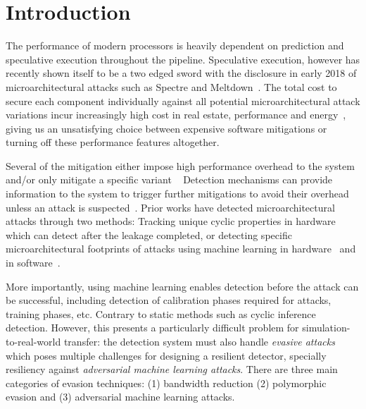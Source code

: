 \section{Introduction} \label{intro}

The performance of modern processors is heavily dependent on prediction and speculative execution throughout the pipeline.  Speculative execution, however has recently shown itself to be a two edged sword with the disclosure in early 2018 of microarchitectural attacks such as Spectre and Meltdown~\cite{spectre, meltdown}. The total cost to secure each component individually against all potential microarchitectural attack variations incur increasingly high cost in real estate, performance and energy~\cite{canella2018systematic, schwarz2019zombieload}, giving us an unsatisfying choice between expensive software mitigations or turning off these performance features altogether.  

 
Several of the mitigation either impose high performance overhead
to the system and/or only mitigate a specific variant
~\cite{taram_csf19, intelanalysis, kiriansky2018dawg, domnitser2012non,saileshwar2019cleanupspec,retpoline, wang2007new, yu2019speculative, yan2018invisispec,CEASER,amd, koruyeh2019speccfi, arm_css}
Detection mechanisms can provide information to the system to trigger further
mitigations to avoid their overhead unless an attack is suspected~\cite{gulmezoglu2019fortuneteller, PerSpectron, cyclone2019}.
Prior works have detected microarchitectural attacks through two methods: Tracking unique cyclic properties in hardware ~\cite{cyclone2019} which can detect after the leakage completed, or detecting specific microarchitectural footprints of attacks using machine learning in hardware~\cite{PerSpectron, RHMD2017} and in software~\cite{gulmezoglu2019fortuneteller, cacheBasedDetection2016Chiappetta,
CloudRadar2016,
BlackHatFogh,
payer2016hexpads,
ICCAD2015Wang,
Duppel2013Zhang, 
mushtaq:cel-01824512}. 

More importantly, using machine learning enables detection before the attack can be successful, including detection of calibration phases required for attacks, training phases, etc. Contrary to static methods such as cyclic inference detection.  
However, this presents a particularly difficult
problem for simulation-to-real-world transfer: %
the detection
system must also handle {\em evasive attacks} which poses multiple challenges for designing a resilient detector, specially resiliency against {\em adversarial machine learning attacks}. There are three main categories of evasion techniques: (1) bandwidth reduction (2) polymorphic evasion and (3) adversarial machine learning attacks.   

